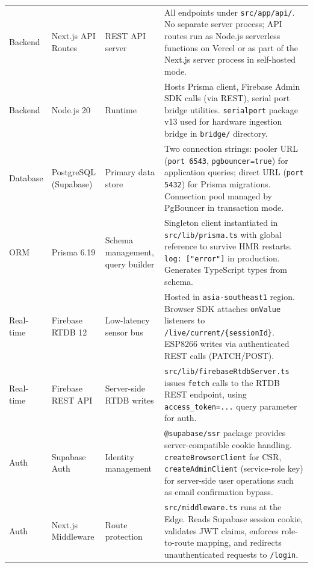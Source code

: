 \documentclass[12pt,a4paper]{report}
\begin{document}
\begin{longtable}{L{2.4cm} L{3.2cm} L{3.0cm} L{6.2cm}}
  Backend & Next.js API Routes & REST API server &
    All endpoints under \texttt{src/app/api/}. No separate server process;
    API routes run as Node.js serverless functions on Vercel or as part of
    the Next.js server process in self-hosted mode. \\

  Backend & Node.js 20 & Runtime &
    Hosts Prisma client, Firebase Admin SDK calls (via REST), serial
    port bridge utilities. \texttt{serialport} package v13 used for
    hardware ingestion bridge in \texttt{bridge/} directory. \\

  Database & PostgreSQL (Supabase) & Primary data store &
    Two connection strings: pooler URL (\texttt{port 6543},
    \texttt{pgbouncer=true}) for application queries; direct URL
    (\texttt{port 5432}) for Prisma migrations. Connection pool
    managed by PgBouncer in transaction mode. \\

  ORM & Prisma 6.19 & Schema management, query builder &
    Singleton client instantiated in \texttt{src/lib/prisma.ts} with
    global reference to survive HMR restarts. \texttt{log: ["error"]}
    in production. Generates TypeScript types from schema. \\

  Real-time & Firebase RTDB 12 & Low-latency sensor bus &
    Hosted in \texttt{asia-southeast1} region. Browser SDK attaches
    \texttt{onValue} listeners to \texttt{/live/current/\{sessionId\}}.
    ESP8266 writes via authenticated REST calls (PATCH/POST). \\

  Real-time & Firebase REST API & Server-side RTDB writes &
    \texttt{src/lib/firebaseRtdbServer.ts} issues
    \texttt{fetch} calls to the RTDB REST endpoint, using
    \texttt{access\_token=...} query parameter for auth. \\

  Auth & Supabase Auth & Identity management &
    \texttt{@supabase/ssr} package provides server-compatible cookie
    handling. \texttt{createBrowserClient} for CSR,
    \texttt{createAdminClient} (service-role key) for server-side user
    operations such as email confirmation bypass. \\

  Auth & Next.js Middleware & Route protection &
    \texttt{src/middleware.ts} runs at the Edge. Reads Supabase session
    cookie, validates JWT claims, enforces role-to-route mapping, and
    redirects unauthenticated requests to \texttt{/login}. \\


\end{longtable}
\end{document}
